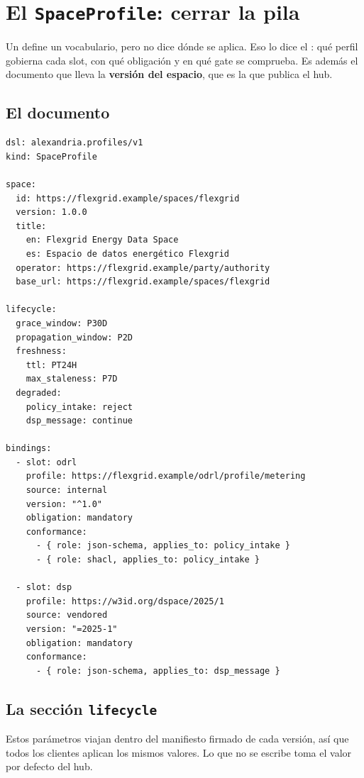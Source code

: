 \chapter{El \texttt{SpaceProfile}: cerrar la pila}
\label{ch:spaceprofile}

Un  define un vocabulario, pero no dice dónde se aplica. Eso lo dice el : qué
perfil gobierna cada slot, con qué obligación y en qué gate se comprueba. Es además el documento que lleva la
\textbf{versión del espacio}, que es la que publica el hub.

\section{El documento}

\begin{lstlisting}[style=yaml]
dsl: alexandria.profiles/v1
kind: SpaceProfile

space:
  id: https://flexgrid.example/spaces/flexgrid
  version: 1.0.0
  title:
    en: Flexgrid Energy Data Space
    es: Espacio de datos energético Flexgrid
  operator: https://flexgrid.example/party/authority
  base_url: https://flexgrid.example/spaces/flexgrid

lifecycle:
  grace_window: P30D
  propagation_window: P2D
  freshness:
    ttl: PT24H
    max_staleness: P7D
  degraded:
    policy_intake: reject
    dsp_message: continue

bindings:
  - slot: odrl
    profile: https://flexgrid.example/odrl/profile/metering
    source: internal
    version: "^1.0"
    obligation: mandatory
    conformance:
      - { role: json-schema, applies_to: policy_intake }
      - { role: shacl, applies_to: policy_intake }

  - slot: dsp
    profile: https://w3id.org/dspace/2025/1
    source: vendored
    version: "=2025-1"
    obligation: mandatory
    conformance:
      - { role: json-schema, applies_to: dsp_message }
\end{lstlisting}

\section{La sección \texttt{lifecycle}}

Estos parámetros viajan dentro del manifiesto firmado de cada versión, así que todos los clientes aplican los
mismos valores. Lo que no se escribe toma el valor por defecto del hub.

